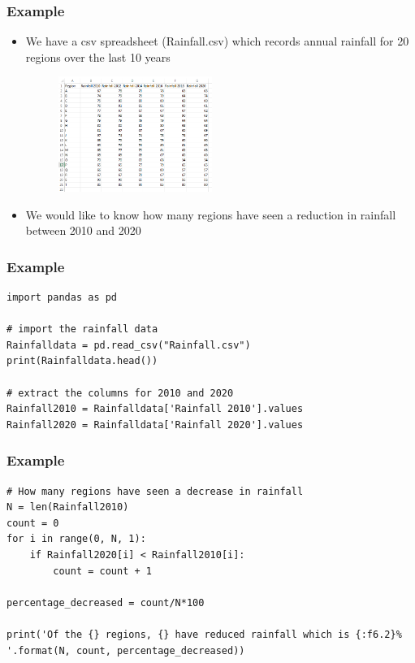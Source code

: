 \documentclass[english,14pt]{beamer}
\begin{document}

\begin{frame}[fragile]
\frametitle{Example}
\begin{itemize}
    \item We have a csv spreadsheet (Rainfall.csv) which records annual rainfall for 20 regions over the last 10 years
    \begin{figure} 
        \centering
        \includegraphics[width=5cm]{figures/excel_rainfall.PNG}
        \label{fig:my_label}
    \end{figure}
    \item We would like to know how many regions have seen a reduction in rainfall between 2010 and 2020
\end{itemize}
\end{frame}


\begin{frame}[fragile]
\frametitle{Example}
\begin{lstlisting}[style=CStyle]
import pandas as pd

# import the rainfall data 
Rainfalldata = pd.read_csv("Rainfall.csv")
print(Rainfalldata.head())

# extract the columns for 2010 and 2020 
Rainfall2010 = Rainfalldata['Rainfall 2010'].values         
Rainfall2020 = Rainfalldata['Rainfall 2020'].values         

\end{lstlisting}
\end{frame}


\begin{frame}[fragile]
\frametitle{Example}
\begin{lstlisting}[style=CStyle]
# How many regions have seen a decrease in rainfall 
N = len(Rainfall2010)
count = 0
for i in range(0, N, 1):
    if Rainfall2020[i] < Rainfall2010[i]:
        count = count + 1

percentage_decreased = count/N*100

print('Of the {} regions, {} have reduced rainfall which is {:f6.2}% '.format(N, count, percentage_decreased))
\end{lstlisting}
\end{frame}
\end{document}
